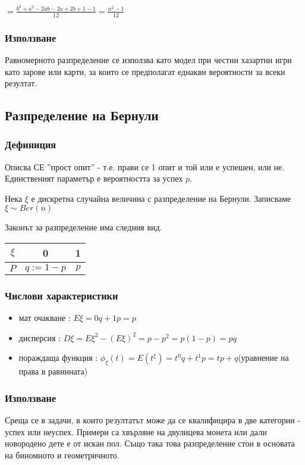 \documentclass[fleqn,12pt]{article}
\begin{document}
\begin{justify}
$ = \frac{b^2 + a^2 -2ab -2a + 2b + 1 - 1}{12} = \frac{n^2 - 1}{12}$ 
\subsubsection{Използване}
Равномерното разпределение се използва като модел при честни хазартни игри като зарове или карти, за които се
предполагат еднакви вероятности за всеки резултат.

\subsection{Разпределение на Бернули}
\subsubsection{Дефиниция} 
Описва СЕ ''прост опит'' - т.е. прави се 1 опит и той или е успешен, или не. Единственият параметър е 
вероятността за успех $p$.

Нека $\xi$ е дискретна случайна величина с разпределение на Бернули. Записваме $\xi \sim Ber(n)$

Законът за разпределение има следния вид.
\begin{tabular}{|c|c|c|}
    \hline
    $\xi$ & 0 & 1 \\
    \hline
    $P$ & $q := 1 - p$ & $p$ \\
    \hline
\end{tabular}

\subsubsection{Числови характеристики} 
\begin{itemize}
    \item мат очакване : $E\xi = 0q + 1p = p$
    \item дисперсия : $D\xi = E\xi^2 - (E\xi)^2 = p - p^2 = p(1-p)  = pq$
    \item пораждаща функция : $\phi_\xi(t) = E(t^\xi) = t^0q + t^1p = tp + q$(уравнение на права в равнината)
\end{itemize}

\subsubsection{Използване} 
Среща се в задачи, в които резултатът може да се квалифицира в две категории - успех или неуспех. Примери са хвърляне 
на двулицева монета или дали новородено дете е от искан пол. Също така това разпределение стои в основата на биномното и
геометричното.


\end{justify}
\end{document}
